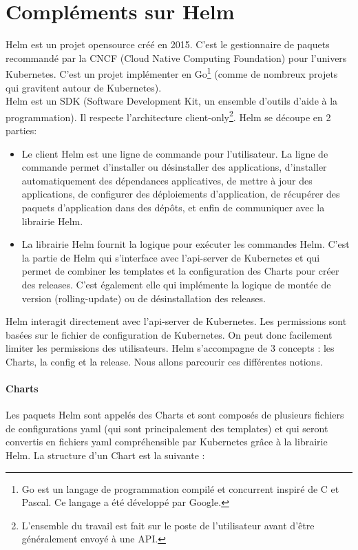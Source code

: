 \documentclass[11pt,fleqn]{book} %
\begin{document}
\chapter{Compléments sur Helm}
\label{Helm}
\vspace{-2cm}
Helm est un projet opensource créé en 2015. C'est le gestionnaire de paquets recommandé par la CNCF (Cloud Native Computing Foundation) pour l'univers Kubernetes. C'est un projet implémenter en Go\footnote{Go est un langage de programmation compilé et concurrent inspiré de C et Pascal. Ce langage a été développé par Google.} (comme de nombreux projets qui gravitent autour de Kubernetes).\\

Helm est un SDK (Software Development Kit, un ensemble d’outils d’aide à la programmation). Il respecte l'architecture client-only\footnote{L'ensemble du travail est fait sur le poste de l'utilisateur avant d'être généralement envoyé à une API.}. Helm se découpe en 2 parties:
\begin{itemize}
    \item Le client Helm est une ligne de commande pour l'utilisateur. La ligne de commande permet d'installer ou désinstaller des applications, d'installer automatiquement des dépendances applicatives, de mettre à jour des applications, de configurer des déploiements d'application, de récupérer des paquets d'application dans des dépôts, et enfin de communiquer avec la librairie Helm.
    \item La librairie Helm fournit la logique pour exécuter les commandes Helm. C'est la partie de Helm qui s'interface avec l'api-server de Kubernetes et qui permet de combiner les templates et la configuration des Charts pour créer des releases. C'est également elle qui implémente la logique de montée de version (rolling-update) ou de désinstallation des releases.\\
\end{itemize}

Helm interagit directement avec l'api-server de Kubernetes. Les permissions sont basées sur le fichier de configuration de Kubernetes. On peut donc facilement limiter les permissions des utilisateurs. Helm s'accompagne de 3 concepts : les Charts, la config et la release. Nous allons parcourir ces différentes notions.

\subsubsection{Charts}
Les paquets Helm sont appelés des Charts et sont composés de plusieurs fichiers de configurations yaml (qui sont principalement des templates) et qui seront convertis en fichiers yaml compréhensible par Kubernetes grâce à la librairie Helm. La structure d'un Chart est la suivante :
\end{document}
